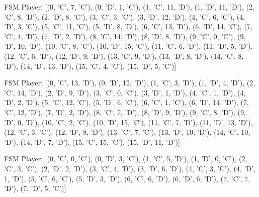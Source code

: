 \item FSM Player: [(0, 'C', 7, 'C'), (0, 'D', 1, 'C'), (1, 'C', 11, 'D'), (1, 'D', 11, 'D'), (2, 'C', 8, 'D'), (2, 'D', 8, 'C'), (3, 'C', 3, 'C'), (3, 'D', 12, 'D'), (4, 'C', 6, 'C'), (4, 'D', 3, 'C'), (5, 'C', 11, 'C'), (5, 'D', 8, 'D'), (6, 'C', 13, 'D'), (6, 'D', 14, 'C'), (7, 'C', 4, 'D'), (7, 'D', 2, 'D'), (8, 'C', 14, 'D'), (8, 'D', 8, 'D'), (9, 'C', 0, 'C'), (9, 'D', 10, 'D'), (10, 'C', 8, 'C'), (10, 'D', 15, 'C'), (11, 'C', 6, 'D'), (11, 'D', 5, 'D'), (12, 'C', 6, 'D'), (12, 'D', 9, 'D'), (13, 'C', 9, 'D'), (13, 'D', 8, 'D'), (14, 'C', 8, 'D'), (14, 'D', 13, 'D'), (15, 'C', 4, 'C'), (15, 'D', 5, 'C')]
\item FSM Player: [(0, 'C', 13, 'D'), (0, 'D', 12, 'D'), (1, 'C', 3, 'D'), (1, 'D', 4, 'D'), (2, 'C', 14, 'D'), (2, 'D', 9, 'D'), (3, 'C', 0, 'C'), (3, 'D', 1, 'D'), (4, 'C', 1, 'D'), (4, 'D', 2, 'D'), (5, 'C', 12, 'C'), (5, 'D', 6, 'C'), (6, 'C', 1, 'C'), (6, 'D', 14, 'D'), (7, 'C', 12, 'D'), (7, 'D', 2, 'D'), (8, 'C', 7, 'D'), (8, 'D', 9, 'D'), (9, 'C', 8, 'D'), (9, 'D', 0, 'D'), (10, 'C', 2, 'C'), (10, 'D', 15, 'C'), (11, 'C', 7, 'D'), (11, 'D', 13, 'D'), (12, 'C', 3, 'C'), (12, 'D', 8, 'D'), (13, 'C', 7, 'C'), (13, 'D', 10, 'D'), (14, 'C', 10, 'D'), (14, 'D', 7, 'D'), (15, 'C', 15, 'C'), (15, 'D', 11, 'D')]
\item FSM Player: [(0, 'C', 0, 'C'), (0, 'D', 3, 'C'), (1, 'C', 5, 'D'), (1, 'D', 0, 'C'), (2, 'C', 3, 'C'), (2, 'D', 2, 'D'), (3, 'C', 4, 'D'), (3, 'D', 6, 'D'), (4, 'C', 3, 'C'), (4, 'D', 1, 'D'), (5, 'C', 6, 'C'), (5, 'D', 3, 'D'), (6, 'C', 6, 'D'), (6, 'D', 6, 'D'), (7, 'C', 7, 'D'), (7, 'D', 5, 'C')]
